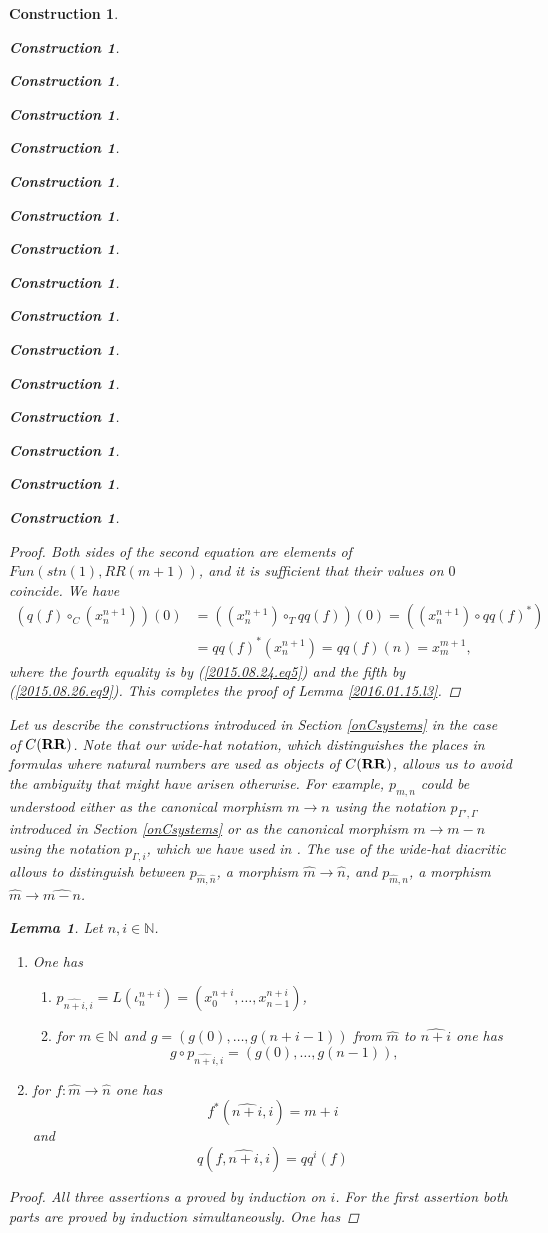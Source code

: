 \documentclass[onecolumn,12pt]{amsart}
\newtheorem{lemma}[proposition]{Lemma}
\numberwithin{proposition}{subsection}
\newtheorem{construction}[proposition]{Construction}
\newcommand{\sr}{\rightarrow}
\newcommand{\nn}{{\mathbb N}}
\newcommand{\nat}{\nn}
\newcommand{\wh}{\widehat}
\newcommand{\mbind}[1]{{#1^*}}
\newcommand{\RR}{{\bf RR}}
\begin{document}
\begin{construction}
\begin{construction}
\begin{construction}
\begin{construction}
\begin{construction}
\begin{construction}
\begin{construction}
\begin{construction}
\begin{construction}
\begin{construction}
\begin{construction}
\begin{construction}
\begin{construction}
\begin{construction}
\begin{construction}
\begin{construction}
\begin{proof}
Both sides of the second equation are elements of $Fun(stn(1),RR(m+1))$, and it
is sufficient that their values on $0$ coincide. We have
%
\begin{equation*}
  \begin{split}
    (q(f)\circ_C (x_n^{n+1}))(0)&=((x_n^{n+1})\circ_T qq(f))(0)=((x_n^{n+1})\circ \mbind{qq(f)})
    \\
    &= \mbind{qq(f)}(x_n^{n+1})=qq(f)(n)=x_m^{m+1},
  \end{split}
\end{equation*}
%
where the fourth equality is by (\ref{2015.08.24.eq5}) and the fifth by
(\ref{2015.08.26.eq9}). This completes the proof of Lemma \ref{2016.01.15.l3}.
\end{proof}

%
Let us describe the constructions introduced in Section \ref{onCsystems} in the
case of $C(\RR)$. Note that our wide-hat notation, which distinguishes the places
in formulas where natural numbers are used as objects of $C(\RR)$, allows us to
avoid the ambiguity that might have arisen otherwise. For example, $p_{m,n}$
could be understood either as the canonical morphism $m\sr n$ using the
notation $p_{\Gamma',\Gamma}$ introduced in Section \ref{onCsystems} or as the
canonical morphism $m\sr m-n$ using the notation $p_{\Gamma,i}$, which we have
used in \cite{Csubsystems}.  The use of the wide-hat diacritic allows to
distinguish between $p_{\wh{m},\wh{n}}$, a morphism $\wh{m}\sr \wh{n}$, and
$p_{\wh{m},n}$, a morphism $\wh{m}\sr \wh{m-n}$.
%
\begin{lemma}
\label{2015.08.22.l6}
Let $n,i\in\nat$. 
%
\begin{enumerate}
\item One has
%
\begin{enumerate}
\item $p_{\wh{n+i},i}=L(\iota^{n+i}_{n})=(x_0^{n+i},\dots,x_{n-1}^{n+i})$,
\item for $m\in\nat$ and $g=(g(0),\dots,g(n+i-1))$ from $\wh{m}$ to $\wh{n+i}$ one has 
%
$$g\circ p_{\wh{n+i},i}=(g(0),\dots,g(n-1)),$$
%
\end{enumerate}
%
\item for $f:\wh{m}\sr \wh{n}$ one has
%
$$f^*(\wh{n+i},i)=m+i$$
%
and
%
$$q(f,\wh{n+i},i)=qq^i(f)$$
%
\end{enumerate}
\end{lemma}
%
\begin{proof}
All three assertions a proved by induction on $i$. For the first assertion both
parts are proved by induction simultaneously. One has

\end{proof}
\end{construction}
\end{construction}
\end{construction}
\end{construction}
\end{construction}
\end{construction}
\end{construction}
\end{construction}
\end{construction}
\end{construction}
\end{construction}
\end{construction}
\end{construction}
\end{construction}
\end{construction}
\end{construction}
\end{document}
